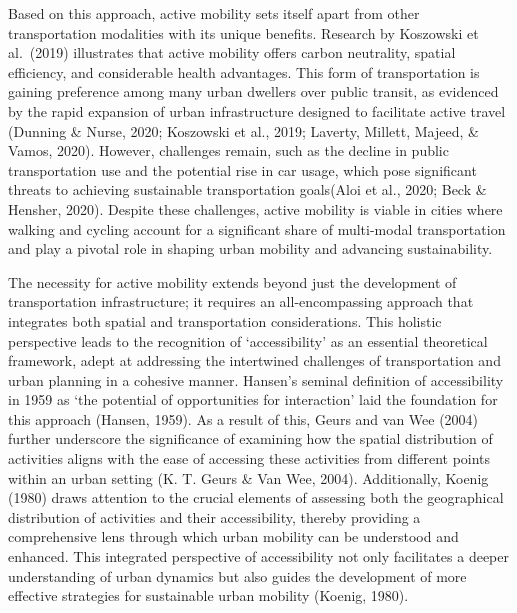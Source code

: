 \documentclass[12pt,twoside]{reedthesis}
\begin{document}
Based on this approach, active mobility sets itself apart from other transportation modalities with its unique benefits. Research by Koszowski et al.~(2019) illustrates that active mobility offers carbon neutrality, spatial efficiency, and considerable health advantages. This form of transportation is gaining preference among many urban dwellers over public transit, as evidenced by the rapid expansion of urban infrastructure designed to facilitate active travel (Dunning \& Nurse, 2020; Koszowski et al., 2019; Laverty, Millett, Majeed, \& Vamos, 2020). However, challenges remain, such as the decline in public transportation use and the potential rise in car usage, which pose significant threats to achieving sustainable transportation goals(Aloi et al., 2020; Beck \& Hensher, 2020). Despite these challenges, active mobility is viable in cities where walking and cycling account for a significant share of multi-modal transportation and play a pivotal role in shaping urban mobility and advancing sustainability.

The necessity for active mobility extends beyond just the development of transportation infrastructure; it requires an all-encompassing approach that integrates both spatial and transportation considerations. This holistic perspective leads to the recognition of `accessibility' as an essential theoretical framework, adept at addressing the intertwined challenges of transportation and urban planning in a cohesive manner. Hansen's seminal definition of accessibility in 1959 as `the potential of opportunities for interaction' laid the foundation for this approach (Hansen, 1959). As a result of this, Geurs and van Wee (2004) further underscore the significance of examining how the spatial distribution of activities aligns with the ease of accessing these activities from different points within an urban setting (K. T. Geurs \& Van Wee, 2004). Additionally, Koenig (1980) draws attention to the crucial elements of assessing both the geographical distribution of activities and their accessibility, thereby providing a comprehensive lens through which urban mobility can be understood and enhanced. This integrated perspective of accessibility not only facilitates a deeper understanding of urban dynamics but also guides the development of more effective strategies for sustainable urban mobility (Koenig, 1980).
\end{document}
